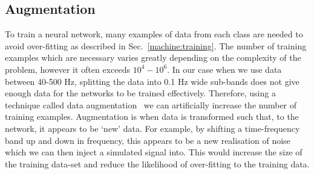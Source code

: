%
\begin{table}
	\caption[Parameters used for simulations of \gls{CW} signals.]{\label{machine:data:injections:table} Table shows the upper and lower limits
		over which each signal parameter was randomized. The parameters $\alpha,\sin{\left(\delta \right)},f,\;\log{\left( \dot{f} \right)},\; \cos{\left(\iota
			\right)},\; \phi_0,\; \psi$ were sampled
		uniformly in the ranges specified in the table. The frequencies $f_{\rm l}$ and $f_{\rm u}$
		refer to the lower and upper frequency of the band that each signal is injected
		into. Excluding the distribution of frequencies $f$, all the injection parameters are sampled from the same distributions as the S6
		\gls{MDC}~\cite{walsh2016ComparisonMethods}.}
\end{table}

\subsection{\label{machine:data:augmentation} Augmentation}

%
To train a neural network, many examples of data from each class are needed to avoid over-fitting as described in Sec.~\ref{machine:training}. The number of training examples which are necessary varies greatly depending on the complexity of the problem, however it often exceeds $10^4-10^6$.
In our case when we use data between 40-500 Hz, splitting the data into 0.1 Hz wide sub-bands does not give enough data for the
networks to be trained effectively. Therefore, using a technique called data
augmentation~\cite{patrice1991TangentProp,baird1992DocumentImage} we can
artificially increase the number of training examples.
Augmentation is when data is transformed such that, to the network, it appears to be `new'
data. 
For example, by shifting a time-frequency band up and down in frequency, this appears to be a new realisation of noise which we can then inject a simulated signal into.
This would increase the size of the training data-set and reduce the likelihood of over-fitting to the training data. 

